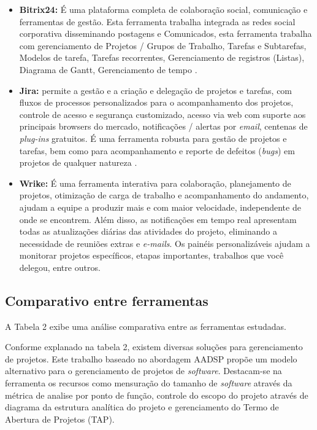 \documentclass{acm_proc_article-sp}
\begin{document}
\begin{itemize}
\item \textbf{Bitrix24:} É uma plataforma completa de colaboração social, comunicação e ferramentas de gestão. Esta ferramenta trabalha integrada as redes social corporativa disseminando postagens e Comunicados, esta ferramenta trabalha com gerenciamento de Projetos / Grupos de Trabalho, Tarefas e Subtarefas, Modelos de tarefa, Tarefas recorrentes, Gerenciamento de registros (Listas), Diagrama de Gantt, Gerenciamento de tempo \cite{bitrix24:ferramenta}.
\item \textbf{Jira:}  permite a gestão e a criação e delegação de projetos e tarefas, com fluxos de processos personalizados para o acompanhamento dos projetos, controle de acesso e segurança customizado, acesso via web com suporte aos principais browsers do mercado, notificações / alertas por \textit{email},  centenas de \textit{plug-ins} gratuitos. É uma ferramenta robusta para gestão de projetos e tarefas, bem como para acompanhamento e reporte de defeitos (\textit{bugs}) em projetos de qualquer natureza \cite{jira:ferramenta}.
\item \textbf{Wrike:} É uma ferramenta interativa para colaboração, planejamento de projetos, otimização de carga de trabalho e acompanhamento do andamento, ajudam a equipe a produzir mais e com maior velocidade, independente de onde se encontrem. Além disso, as notificações em tempo real apresentam todas as atualizações diárias das atividades do projeto, eliminando a necessidade de reuniões extras e \textit{e-mails}. Os painéis personalizáveis ajudam a monitorar projetos específicos, etapas importantes, trabalhos que você delegou, entre outros.  
\end{itemize}

\subsection{Comparativo entre ferramentas}
 A Tabela 2 exibe uma análise comparativa entre as ferramentas estudadas.

Conforme explanado na tabela 2, existem diversas soluções para gerenciamento de projetos. Este trabalho baseado no abordagem AADSP propõe um modelo alternativo para o gerenciamento de projetos de \textit{software}. Destacam-se na ferramenta os recursos como mensuração do tamanho de \textit{software} através da métrica de analise por ponto de função, controle do escopo do projeto através de diagrama da estrutura analítica do projeto e gerenciamento do Termo de Abertura de Projetos (TAP). 
\end{document}
